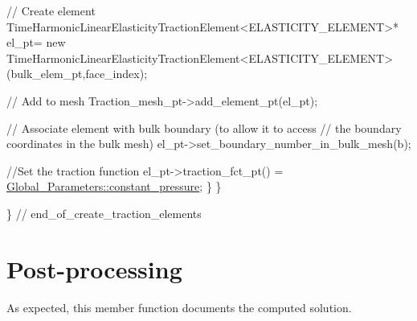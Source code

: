 \begin{DoxyCodeInclude}
     \textcolor{comment}{// Create element}
     TimeHarmonicLinearElasticityTractionElement<ELASTICITY\_ELEMENT>* el\_pt=
      \textcolor{keyword}{new} TimeHarmonicLinearElasticityTractionElement<ELASTICITY\_ELEMENT>
      (bulk\_elem\_pt,face\_index);   

     \textcolor{comment}{// Add to mesh}
     Traction\_mesh\_pt->add\_element\_pt(el\_pt);
     
     \textcolor{comment}{// Associate element with bulk boundary (to allow it to access}
     \textcolor{comment}{// the boundary coordinates in the bulk mesh)}
     el\_pt->set\_boundary\_number\_in\_bulk\_mesh(b); 
     
     \textcolor{comment}{//Set the traction function}
     el\_pt->traction\_fct\_pt() = \hyperlink{namespaceGlobal__Parameters_a8363ab9f8687e9f7802f801f6dcab6e6}{Global\_Parameters::constant\_pressure};
    \}
  \}
 
\} \textcolor{comment}{// end\_of\_create\_traction\_elements}

\end{DoxyCodeInclude}




 

\hypertarget{index_doc}{}\section{Post-\/processing}\label{index_doc}
As expected, this member function documents the computed solution.

